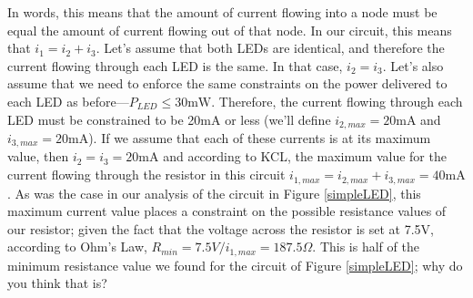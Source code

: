 In words, this means that the amount of current flowing into a node must be equal the amount of current flowing out of that node. In our circuit, this means that $i_1=i_2+i_3$. Let's assume that both LEDs are identical, and therefore the current flowing through each LED is the same. In that case, $i_2=i_3$. Let's also assume that we need to enforce the same constraints on the power delivered to each LED as before---$P_{LED}\leq30\textrm{mW}$. Therefore, the current flowing through each LED must be constrained to be 20mA or less (we'll define $i_{2,max}=20\textrm{mA}$ and $i_{3,max}=20\textrm{mA}$). If we assume that each of these currents is at its maximum value, then $i_2=i_3=20\textrm{mA}$ and according to KCL, the maximum value for the current flowing through the resistor in this circuit $i_{1,max}=i_{2,max}+i_{3,max}=40\textrm{mA}$. As was the case in our analysis of the circuit in Figure \ref{simpleLED}, this maximum current value places a constraint on the possible resistance values of our resistor; given the fact that the voltage across the resistor is set at 7.5V, according to Ohm's Law, $R_{min}=7.5V/i_{1,max}=187.5\Omega$. This is half of the minimum resistance value we found for the circuit of Figure \ref{simpleLED}; why do you think that is?

